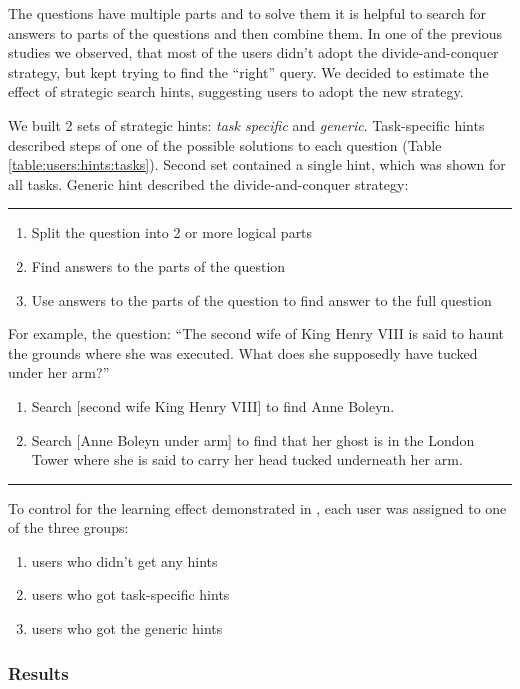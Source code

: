 The questions have multiple parts and to solve them it is helpful to search for answers to parts of the questions and then combine them.
In one of the previous studies we observed, that most of the users didn't adopt the divide-and-conquer strategy, but kept trying to find the ``right'' query.
We decided to estimate the effect of strategic search hints, suggesting users to adopt the new strategy.

We built 2 sets of strategic hints: \textit{task specific} and \textit{generic}.
Task-specific hints described steps of one of the possible solutions to each question (Table \ref{table:users:hints:tasks}).
Second set contained a single hint, which was shown for all tasks. Generic hint described the divide-and-conquer strategy:\\
\hrule
\begin{enumerate}
\item Split the question into 2 or more logical parts
\item Find answers to the parts of the question
\item Use answers to the parts of the question to find answer to the full question
\end{enumerate}

For example, the question: ``The second wife of King Henry VIII is said to haunt the grounds where she was executed. What does she supposedly have tucked under her arm?''
\begin{enumerate}
\item Search [second wife King Henry VIII] to find Anne Boleyn.
\item Search [Anne Boleyn under arm] to find that her ghost is in the London Tower where she is said to carry her head tucked underneath her arm.
\end{enumerate}
\hrule

To control for the learning effect demonstrated in \cite{Moraveji:2011:MIU:2009916.2009966}, each user was assigned to one of the three groups:
\begin{enumerate}
\item users who didn't get any hints
\item users who got task-specific hints
\item users who got the generic hints
\end{enumerate}


\subsubsection{Results}
\label{section:users:hints:results}

